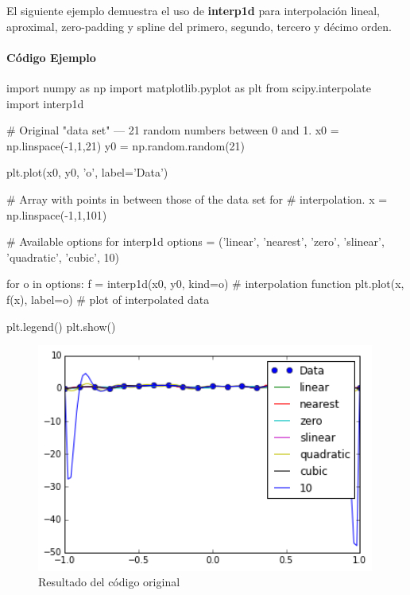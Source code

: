 \documentclass[12pt,spanish]{article}
\begin{document}
El siguiente ejemplo demuestra el uso de \textbf{interp1d} para interpolación lineal, aproximal, zero-padding y spline del primero, segundo, tercero y décimo orden.

\clearpage

\paragraph{Código Ejemplo}

\begin{center}
\begin{boxedverbatim}
import numpy as np
import matplotlib.pyplot as plt
from scipy.interpolate import interp1d

# Original "data set" --- 21 random numbers between 0 and 1.
x0 = np.linspace(-1,1,21)
y0 = np.random.random(21)

plt.plot(x0, y0, 'o', label='Data')

# Array with points in between those of the data set for
# interpolation.
x = np.linspace(-1,1,101)

# Available options for interp1d
options = ('linear', 'nearest', 'zero', 'slinear',
           'quadratic', 'cubic', 10)

for o in options:
    f = interp1d(x0, y0, kind=o)  # interpolation function
    plt.plot(x, f(x), label=o)    # plot of interpolated data

plt.legend()
plt.show()
\end{boxedverbatim}
\end{center}

\begin{figure}[H]
    \centering
	\includegraphics[height=7.5cm]{original.png}
    \caption{Resultado del código original}
\end{figure}
\end{document}
